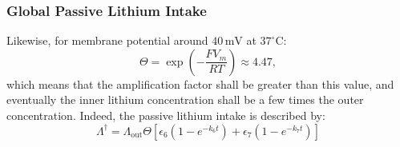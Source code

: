 \documentclass[aps,onecolumn,12pt]{revtex4}
\newcommand{\LiAll}{\Lambda}
\newcommand{\LiAllOut}{{\LiAll}_{\mathrm{out}}}
\newcommand{\ko}{\dagger}
\begin{document}
\subsubsection{Global Passive Lithium Intake}
Likewise, for membrane potential around $40\,\text{mV}$ at $37^\circ\text{C}$:
\begin{equation}
\label{eq:ThetaValue}
	\Theta = \exp\left( -\dfrac{FV_m}{RT}\right) \approx 4.47,
\end{equation}
which means that the amplification factor shall be greater than this value, and eventually the inner lithium concentration shall
be a few times the outer concentration. Indeed, the passive lithium intake is described by:
\begin{equation}
\label{eq:LiAllKO}
	\LiAll^\ko = \LiAllOut \Theta \left[ \epsilon_6 \left(1-e^{-k_6t}\right)  + \epsilon_7 \left(1-e^{-k_7t}\right)\right]
\end{equation}
\end{document}
